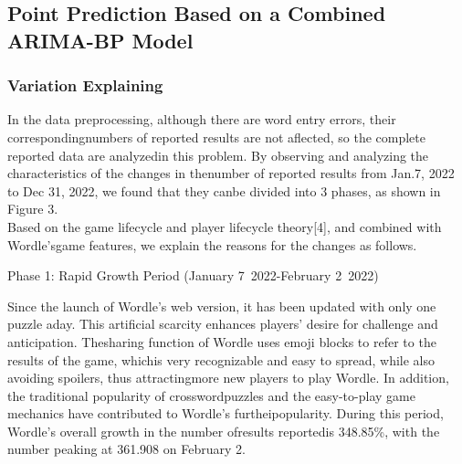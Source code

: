 \documentclass[12pt]{ctexart}
\begin{document}
\subsection{Point Prediction Based on a Combined ARIMA-BP Model}
\subsubsection{Variation Explaining}
In the data preprocessing, although there are word entry errors, their correspondingnumbers of reported results are not aflected, so the complete reported data are analyzedin this problem. By observing and analyzing the characteristics of the changes in thenumber of reported results from Jan.7, 2022 to Dec 31, 2022, we found that they canbe divided into 3 phases, as shown in Figure 3.
\\
Based on the game lifecycle and player lifecycle theory[4], and combined with Wordle'sgame features, we explain the reasons for the changes as follows.


\raisebox{-0.8ex}{\scalebox{2.2}{\textbullet}}\hspace{0.5em} Phase 1: Rapid Growth Period (January 7\, 2022-February 2\, 2022)

Since the launch of Wordle's web version, it has been updated with only one puzzle aday. This artificial scarcity enhances players' desire for challenge and anticipation. Thesharing function of Wordle uses emoji blocks to refer to the results of the game, whichis very recognizable and easy to spread, while also avoiding spoilers, thus attractingmore new players to play Wordle. In addition, the traditional popularity of crosswordpuzzles and the easy-to-play game mechanics have contributed to Wordle's furtheipopularity. During this period, Wordle's overall growth in the number ofresults reportedis 348.85\%, with the number peaking at 361.908 on February 2.

\end{document}
